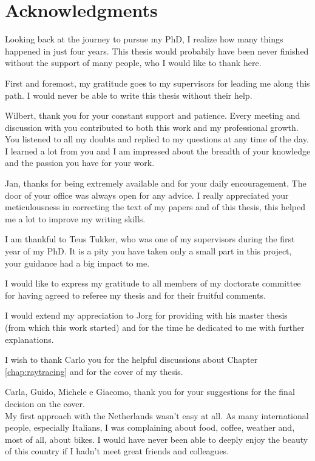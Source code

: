 
\chapter*{Acknowledgments}
\markboth{}{}
Looking back at the journey to pursue my PhD, I realize how many things happened in just four years. This thesis would probabily have been never finished without the support of many people, who I would like to thank here.  

First and foremost, my gratitude goes to my supervisors for leading me along this path. I would never be able to write this thesis without their help.

Wilbert, thank you for your constant support and patience. Every meeting and discussion with you contributed to both this work and my professional growth. 
You listened to all my doubts and replied to my questions at any time of the day.
I learned a lot from you and I am impressed about the breadth of your knowledge and the passion you have for your work. 

Jan, thanks for being extremely available and for your daily encouragement. The door of your office was always open for any advice. 
I really appreciated your meticulousness in correcting the text of my papers and of this thesis, this helped me a lot to improve my writing skills.

I am thankful to Teus Tukker, who was one of my supervisors during the first year of my PhD. It is a pity you have taken only a small part in this project, your guidance had a big impact to me.

I would like to express my gratitude to all members of my doctorate committee for having agreed to referee my thesis and for their fruitful comments.  

I would extend my appreciation to Jorg for providing with his master thesis (from which this work started) and for the time he dedicated to me with further explanations.

I wish to thank Carlo you for the helpful discussions about Chapter \ref{chap:raytracing} and for the cover of my thesis. 

Carla, Guido, Michele e Giacomo, thank you for your suggestions for the final decision on the cover. \\

My first approach with the Netherlands wasn't easy at all. As many international people, especially Italians, I was complaining about food, coffee, weather and, most of all, about bikes. 
I would have never been able to deeply enjoy the beauty of this country if I hadn't meet great friends and colleagues.

